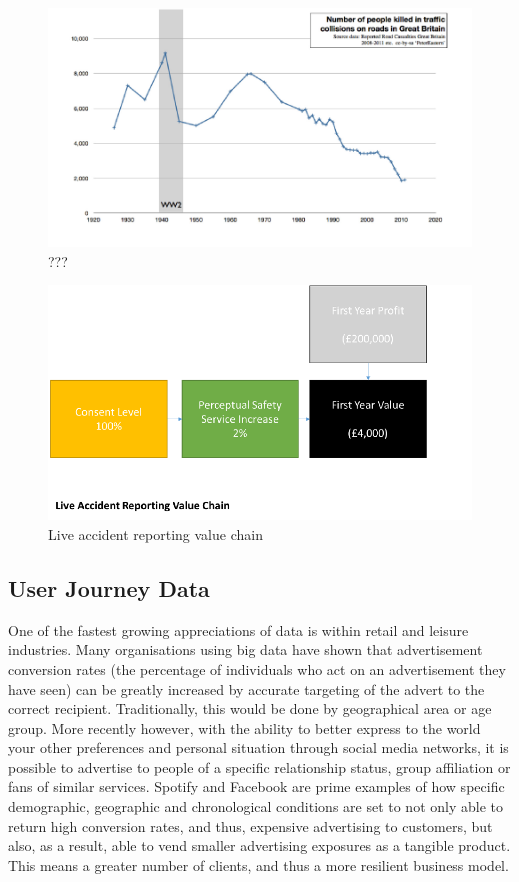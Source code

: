 \documentclass[conference]{IEEEtran}
\begin{document}
\begin{figure}[!htp]
\centering
\includegraphics[width=\columnwidth]{images/ukroaddeaths.png}
\caption{???}
\label{fig:ukroaddeaths}
\end{figure}

\begin{figure}[!htp]
\centering
\includegraphics[width=\columnwidth]{images/liveaccidentvc.png}
\caption{Live accident reporting value chain}
\label{fig:liveaccidentvc}
\end{figure}

\subsection{User Journey Data}

One of the fastest growing appreciations of data is within retail and
leisure industries.  Many organisations using big data have shown that
advertisement conversion rates (the percentage of individuals who act
on an advertisement they have seen) can be greatly increased by
accurate targeting of the advert to the correct
recipient. Traditionally, this would be done by geographical area or
age group. More recently however, with the ability to better express
to the world your other preferences and personal situation through
social media networks, it is possible to advertise to people of a
specific relationship status, group affiliation or fans of similar
services. Spotify and Facebook are prime examples of how specific
demographic, geographic and chronological conditions are set to not
only able to return high conversion rates, and thus, expensive
advertising to customers, but also, as a result, able to vend smaller
advertising exposures as a tangible product. This means a greater
number of clients, and thus a more resilient business model.
\end{document}
